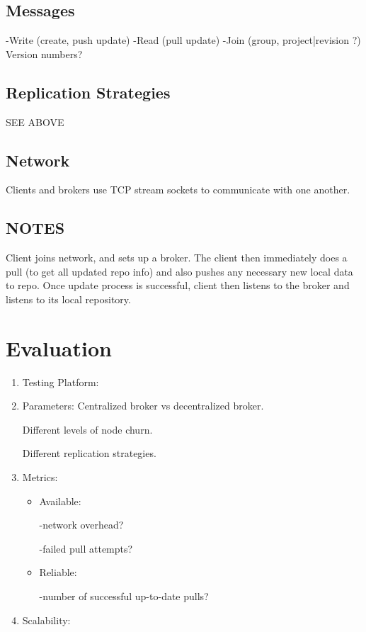 \subsection{Messages}
-Write (create, push update)
-Read (pull update)
-Join (group, project|revision ?)
Version numbers?
\subsection{Replication Strategies}
SEE ABOVE
\subsection{Network}
Clients and brokers use TCP stream sockets to communicate with one another.
\subsection{NOTES}
Client joins network, and sets up a broker. The client then immediately does a pull (to get all updated repo info) and also pushes any necessary new local data to repo.
Once update process is successful, client then listens to the broker and listens to its local repository.

\section{Evaluation}
\begin{enumerate}
\item Testing Platform:
\item Parameters:
Centralized broker vs decentralized broker.

Different levels of node churn.

Different replication strategies.
\item Metrics:
\begin{itemize}
\item Available:

-network overhead?

-failed pull attempts?
\item Reliable:

-number of successful up-to-date pulls?
\end{itemize}
\item Scalability:
\end{enumerate}
